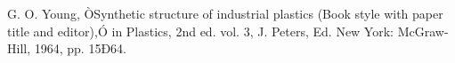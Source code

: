\documentclass[letterpaper, 10 pt, conference]{ieeeconf}  %
\begin{document}
\begin{thebibliography}{99}

 G. O. Young, ÒSynthetic structure of industrial plastics (Book style with paper title and editor),Ó 	in Plastics, 2nd ed. vol. 3, J. Peters, Ed.  New York: McGraw-Hill, 1964, pp. 15Ð64.

\end{thebibliography}
\end{document}
